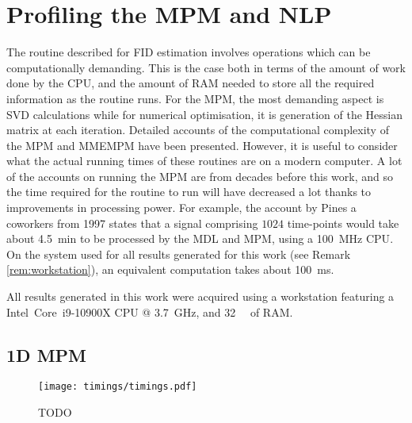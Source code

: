 \section{Profiling the \acs{MPM} and \acs{NLP}}
\label{sec:profiling}
The routine described for \ac{FID} estimation involves operations which can be
computationally demanding. This is the case both in terms of the amount of work
done by the \ac{CPU}, and the amount of \ac{RAM} needed to store all the
required information as the routine runs. For the \ac{MPM}, the most
demanding aspect is \ac{SVD} calculations while for numerical optimisation, it
is generation of the Hessian matrix at each iteration. Detailed accounts of the
computational complexity of the \ac{MPM} and \ac{MMEMPM} have been
presented\cite{Hua1992,Chen2007}.  However, it is useful to consider what the
actual running times of these routines are on a modern computer. A lot of the
accounts on running the \ac{MPM} are from decades before this work, and so the
time required for the routine to run will have decreased a lot thanks to
improvements in processing power. For example, the account by Pines a coworkers
from 1997 states that a signal comprising $1024$ time-points would take about
\qty{4.5}{\minute} to be processed by the \ac{MDL} and \ac{MPM}, using a
\qty{100}{\mega\hertz} \ac{CPU}\cite{Lin1997}. On the system used for all
results generated for this work (see Remark \ref{rem:workstation}), an
equivalent computation takes about \qty{100}{\milli\second}.
\begin{remark}
    \label{rem:workstation}
    All results generated in this work were acquired using a workstation
    featuring a Intel\textregistered\ Core\texttrademark\ i9-10900X CPU @
    \qty{3.7}{\giga\hertz}, and \qty{32}{\gibi\byte} of RAM.
\end{remark}

\subsection{\acs{1D} \acs{MPM}}
\begin{figure}
    \texttt{[image: timings/timings.pdf]}
    \caption{TODO}
    \label{fig:profiling}
\end{figure}

